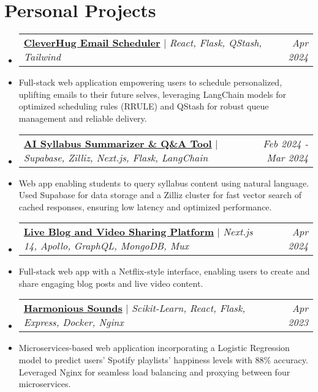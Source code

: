 \documentclass[letterpaper,10pt]{article}
\makeatletter
\newcommand{\resumeItem}[1]{
  \item\small{
    {#1 \vspace{-2.5pt}}
  }
}
\newcommand{\resumeProjectHeading}[3]{
    \item
    \begin{tabular*}{0.97\textwidth}{l@{\extracolsep{\fill}}r}
      \textbf{\small #1} $|$ \emph{\small #2} &\textit{\small#3}
    \end{tabular*}\vspace{-6pt}
}
\newcommand{\resumeSubHeadingListStart}{\begin{itemize}[leftmargin=0.15in, label={}]}
\newcommand{\resumeSubHeadingListEnd}{\end{itemize}}
\makeatother
\begin{document}
\section{Personal Projects}
\resumeSubHeadingListStart
\resumeProjectHeading
{\href{https://cleverhugs.life/}{CleverHug Email Scheduler}}{React, Flask, QStash, Tailwind}{Apr 2024}
\resumeItem{Full-stack web application empowering users to schedule personalized, uplifting emails to their future selves, leveraging LangChain models for optimized scheduling rules (RRULE) and QStash for robust queue management and reliable delivery.}

\resumeProjectHeading
{\href{https://github.com/cornell-dti/mlmn-findoc}{AI Syllabus Summarizer \& Q\&A Tool}}{Supabase, Zilliz, Next.js, Flask, LangChain}{Feb 2024 - Mar 2024}
\resumeItem{Web app enabling students to query syllabus content using natural language. Used Supabase for data storage and a Zilliz cluster for fast vector search of cached responses, ensuring low latency and optimized performance.}

\resumeProjectHeading
{\href{https://private.pratyushsudhakar.com/}{Live Blog and Video Sharing Platform}}{Next.js 14, Apollo, GraphQL, MongoDB, Mux}{Apr 2024}
\resumeItem{Full-stack web app with a Netflix-style interface, enabling users to create and share engaging blog posts and live video content.}

\resumeProjectHeading
{\href{https://github.com/pratyush1712/harmonious-sounds}{Harmonious Sounds}}{Scikit-Learn, React, Flask, Express, Docker, Nginx}{Apr 2023}
\resumeItem{Microservices-based web application incorporating a Logistic Regression model to predict users' Spotify playlists' happiness levels with 88\% accuracy. Leveraged Nginx for seamless load balancing and proxying between four microservices.}

\resumeSubHeadingListEnd

\end{document}
